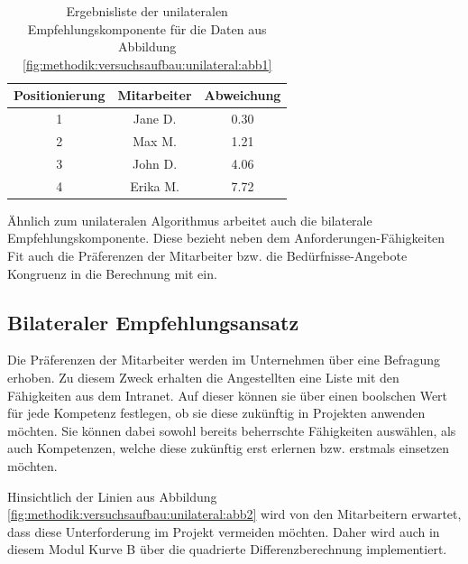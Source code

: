 \begin{table}[h]
	\centering
	\begin{tabular}{c|c|c}
		Positionierung & Mitarbeiter & Abweichung\\
		\hline
		1 & Jane D.  & 0.30\\
		2 & Max M.   & 1.21\\
		3 & John D.  & 4.06\\
		4 & Erika M. & 7.72
	\end{tabular}
	\caption{Ergebnisliste der unilateralen Empfehlungskomponente für die Daten aus Abbildung \ref{fig:methodik:versuchsaufbau:unilateral:abb1}}
	\label{tbl:methodik:versuchsaufbau:unilateral:tbl2}
\end{table}

Ähnlich zum unilateralen Algorithmus arbeitet auch die bilaterale Empfehlungskomponente. Diese bezieht neben dem Anforderungen-Fähigkeiten Fit auch die Präferenzen der Mitarbeiter bzw. die Bedürfnisse-Angebote Kongruenz in die Berechnung mit ein.

\subsection{Bilateraler Empfehlungsansatz}
\label{ch:methodik:versuchsaufbau:bilateral}
Die Präferenzen der Mitarbeiter werden im Unternehmen über eine Befragung erhoben. Zu diesem Zweck erhalten die Angestellten eine Liste mit den Fähigkeiten aus dem Intranet. Auf dieser können sie über einen boolschen Wert für jede Kompetenz festlegen, ob sie diese zukünftig in Projekten anwenden möchten. Sie können dabei sowohl bereits beherrschte Fähigkeiten auswählen, als auch Kompetenzen, welche diese zukünftig erst erlernen bzw. erstmals einsetzen möchten.

Hinsichtlich der Linien aus Abbildung \ref{fig:methodik:versuchsaufbau:unilateral:abb2} wird von den Mitarbeitern erwartet, dass diese Unterforderung im Projekt vermeiden möchten. Daher wird auch in diesem Modul Kurve B über die quadrierte Differenzberechnung implementiert.

